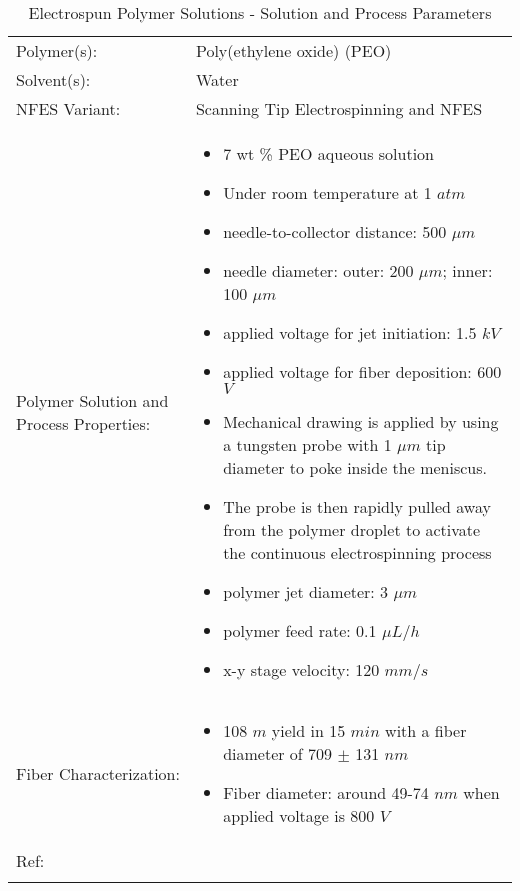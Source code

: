 \begin{table}[th]
\caption{Electrospun Polymer Solutions - Solution and Process Parameters}
\begin{center}
\begin{tabular}{
>{\raggedright\arraybackslash}p{}
>{\raggedright\arraybackslash}p{} }

\hline
Polymer(s): &
Poly(ethylene oxide) (PEO) \\

\arrayrulecolor{lightgray}\hline
Solvent(s): &
Water \\

\hline
NFES Variant: &
Scanning Tip Electrospinning and NFES \\

\hline
Polymer Solution and Process Properties: &
\begin{itemize}[leftmargin=*]
\item 7 wt \% PEO aqueous solution
\item Under room temperature at 1 $atm$
\item needle-to-collector distance: 500 $\mu m$
\item needle diameter: outer: 200 $\mu m$; inner: 100 $\mu m$
\item applied voltage for jet initiation: 1.5 $k V$
\item applied voltage for fiber deposition: 600 $V$
\item Mechanical drawing is applied by using a tungsten probe with 1 $\mu m$ tip diameter to poke inside the meniscus.
\item The probe is then rapidly pulled away from the polymer droplet to activate the continuous electrospinning process
\item polymer jet diameter: 3 $\mu m$
\item polymer feed rate: 0.1 $\mu L / h$
\item x-y stage velocity: 120 $m m / s$
\end{itemize} \\

\hline
Fiber Characterization: &
\begin{itemize}[leftmargin=*]
\item 108 $m$ yield in 15 $min$ with a fiber diameter of 709 $\pm$ 131 $n m$
\item Fiber diameter: around 49-74 $n m$ when applied voltage is 800 $V$
\end{itemize} \\

\hline
Ref: & \cite{Chang2008} \\ %
\arrayrulecolor{black}\hline
\label{tbl:FloresCompare}
\end{tabular}
\end{center}
\end{table}

